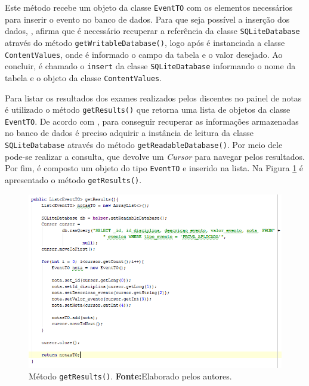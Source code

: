 	\pagebreak
	
	\par Este método recebe um objeto da classe \texttt{EventTO} com os elementos
necessários para inserir o evento no banco de dados. Para que seja possível a
inserção dos dados, , afirma que é necessário
recuperar a referência da classe \texttt{SQLiteDatabase} através do método
\texttt{getWritableDatabase()}, logo após é instanciada a classe
\texttt{ContentValues}, onde é informado o campo da tabela e o valor desejado.
Ao concluir, é chamado o \texttt{insert} da classe \texttt{SQLiteDatabase}
informando o nome da tabela e o objeto da classe \texttt{ContentValues}.

	\par Para listar os resultados dos exames realizados pelos discentes no painel
de notas é utilizado o método \texttt{getResults()} que retorna uma lista de
objetos da classe \texttt{EventTO}. De acordo com ,
para conseguir recuperar as informações armazenadas no banco de dados é preciso
adquirir a instância de leitura da classe \texttt{SQLiteDatabase} através do
método \texttt{getReadableDatabase()}. Por meio dele pode-se realizar a
consulta, que devolve um \textit{Cursor} para navegar pelos resultados. Por
fim, é composto um objeto do tipo \texttt{EventTO} e inserido na lista. Na
Figura \ref{fig:app4} é apresentado o método \texttt{getResults()}.

	\begin{figure}[h!] 
		\centerline{\includegraphics[scale=0.65]{./imagens/2_q_metodologico/4_procedimentos_resultados/42_aplicativo/app4.png}}
		\caption[Método getResults()]{Método \texttt{getResults()}.
		\textbf{Fonte:}Elaborado pelos autores.}
		\label{fig:app4}
	\end{figure}
	
